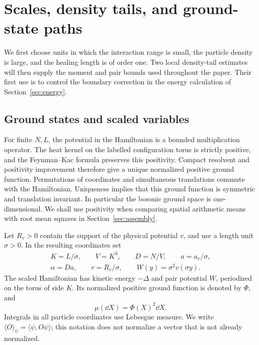 \section{Scales, density tails, and ground-state paths}\label{sec:setup}

We first choose units in which the interaction range is small, the particle
density is large, and the healing length is of order one. Two local
density-tail estimates will then supply the moment and pair bounds used
throughout the paper. Their first use is to control the boundary correction
in the energy calculation of Section~\ref{sec:energy}.

\subsection{Ground states and scaled variables}

For finite $N,L$, the potential in the Hamiltonian is a bounded
multiplication operator. The heat kernel on the labelled configuration
torus is strictly positive, and the Feynman--Kac formula preserves this
positivity. Compact resolvent and positivity improvement therefore give a
unique normalized positive ground function. Permutations of coordinates
and simultaneous translations commute with the Hamiltonian. Uniqueness
implies that this ground function is symmetric and translation invariant.
In particular the bosonic ground space is one-dimensional. We shall use
positivity when comparing spatial arithmetic means with root mean squares
in Section~\ref{sec:assembly}.

Let $R_v>0$ contain the support of the physical potential $v$, and use a
length unit $\sigma>0$. In the resulting coordinates set
\begin{equation}\label{eq:scaled-variables}
 \begin{gathered}
 K=L/\sigma,\qquad V=K^3,\qquad D=N/V,\qquad a=a_v/\sigma,\\
 \alpha=Da,\qquad r=R_v/\sigma,\qquad W(y)=\sigma^2v(\sigma y).
 \end{gathered}
\end{equation}
The scaled Hamiltonian has kinetic energy $-\Delta$ and pair potential
$W$, periodized on the torus of side $K$. Its normalized positive ground
function is denoted by $\Phi$, and
\[
 \mu(\dd X)=\Phi(X)^2\dd X.
\]
Integrals in all particle coordinates use Lebesgue measure. We write
$\langle O\rangle_\psi=\langle\psi,O\psi\rangle$; this notation does not
normalize a vector that is not already normalized.

